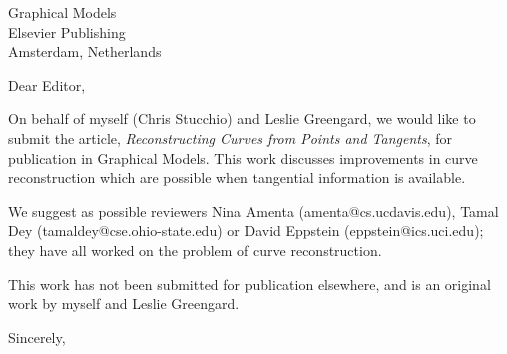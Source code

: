 \documentclass{letter}
\begin{document}
\begin{letter}{Graphical Models \\ Elsevier Publishing\\Amsterdam, Netherlands}
  \opening{Dear Editor,}

  On behalf of myself (Chris Stucchio) and Leslie Greengard, we would like to submit the article, \emph{Reconstructing Curves from Points and Tangents}, for publication in Graphical Models. This work discusses improvements in curve reconstruction which are possible when  tangential information is available.

  We suggest as possible reviewers Nina Amenta (amenta@cs.ucdavis.edu), Tamal Dey (tamaldey@cse.ohio-state.edu) or David Eppstein (eppstein@ics.uci.edu); they have all worked on the problem of curve reconstruction.

  This work has not been submitted for publication elsewhere, and is an original work by myself and Leslie Greengard.

  \closing{Sincerely,}

\end{letter}
\end{document}
